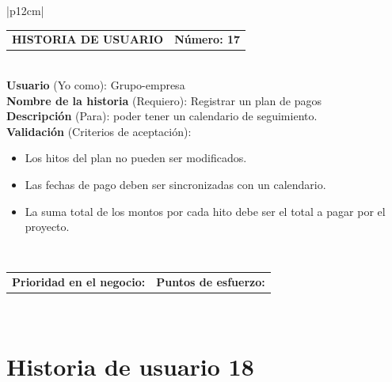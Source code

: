 \documentclass[11pt,letterpaper]{report}
\begin{document}
	\begin{center}	
		\begin{tabular}{|p{12cm}|}
			\hline
			\begin{tabular}{c|c}
				\textbf{HISTORIA DE USUARIO} & \textbf{Número: 17} \\
			\end{tabular} \\ \hline
			\textbf{Usuario} (Yo como): Grupo-empresa \\ \hline
			\textbf{Nombre de la historia} (Requiero): Registrar un plan de pagos \\ \hline
			\textbf{Descripción} (Para): poder tener un calendario de seguimiento. \\ \hline
			\textbf{Validación} (Criterios de aceptación): \\
			\begin{minipage}{12cm}
				\begin{itemize}
					\item Los hitos del plan no pueden ser modificados.
					\item Las fechas de pago deben ser sincronizadas con un calendario.
					\item La suma total de los montos por cada hito debe ser el total a pagar por el proyecto.
				\end{itemize}
			\end{minipage} \\ \hline
			\begin{tabular}{p{5cm}|c}
				\textbf{Prioridad en el negocio: } & \textbf{Puntos de esfuerzo: } \\
			\end{tabular} \\ \hline
		\end{tabular}
	\end{center}
	
	\section{Historia de usuario 18}
	
\end{document}
